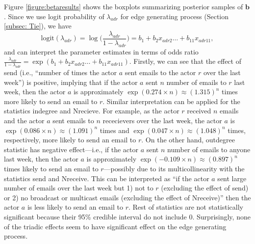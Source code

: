 \documentclass[12pt]{article}
\begin{document}
Figure \ref{figure:betaresults} shows the boxplots summarizing posterior samples of $\boldsymbol{b}$. Since we use logit probability of $\lambda_{adr}$ for edge generating process (Section \ref{subsec: Tie}), we have
\begin{equation*}
\mbox{logit}(\lambda_{adr})=\log\Big(\frac{\lambda_{adr}}{1-\lambda_{adr}}\Big) =b_{1}+b_{2} x_{adr2}\ldots+b_{11}x_{adr11},
\end{equation*}
and can interpret the parameter estimates in terms of odds ratio $\frac{\lambda_{adr}}{1-\lambda_{adr}}=\exp(b_{1}+b_{2} x_{adr2}\ldots+b_{11}x_{adr11})$.
Firstly, we can see that the effect of send (i.e., ``number of times the actor $a$ sent emails to the actor $r$ over the last week'') is positive, implying that if the actor $a$ sent $n$ number of emails to $r$ last week, then the actor $a$ is approximately $\exp(0.274\times n)\approx(1.315)^n$ times more likely to send an email to $r$. Similar interpretation can be applied for the statistics indegree and Nrecieve. For example, as the actor $r$ received $n$ emails and the actor $a$ sent emails to $n$ rececievers over the last week, the actor $a$ is $\exp(0.086\times n)\approx(1.091)^n $ times and $\exp(0.047\times n)\approx(1.048)^n$ times, respectively, more likely to send an email to $r$. On the other hand, outdegree statistic has negative effect---i.e., if the actor $a$ sent $n$ number of emails to anyone last week, then the actor $a$ is approximately $\exp(-0.109\times n)\approx(0.897)^n$ times likely to send an email to $r$---possibly due to its multicollinearity with the statistics send and Nreceive. This can be interpreted as ``if the actor $a$ sent large number of emails over the last week but 1) not to $r$ (excluding the effect of send) or 2) no broadcast or multicast emails (excluding the effect of Nreceive)'' then the actor $a$ is less likely to send an email to $r$. Rest of statistics are not statistically significant because their 95\% credible interval do not include 0. Surprisingly, none of the triadic effects seem to have significant effect on the edge generating process.
\end{document}
